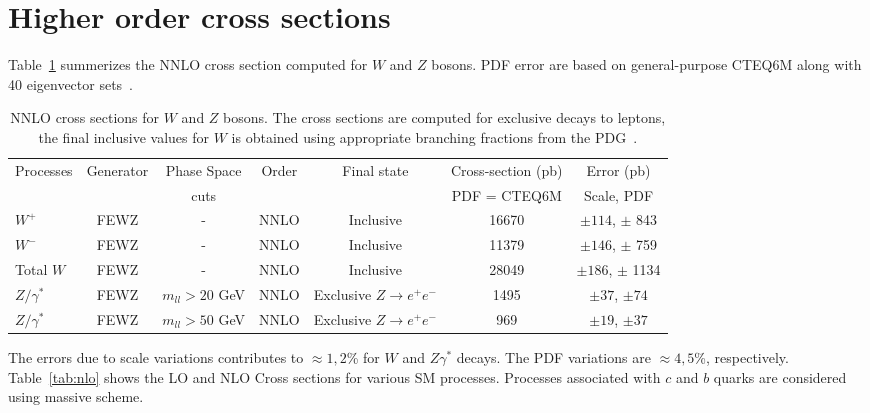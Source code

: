 \section{Higher order cross sections}
\label{sec:results}

Table~\ref{tab:nnlo} summerizes the NNLO cross section computed for $W$ and $Z$ bosons. 
PDF error are based on general-purpose CTEQ6M along with 40 eigenvector sets~\cite{cteq6m}.

\vspace{3mm}
\begin{table}[hbt]
\begin{center}
\renewcommand{\arraystretch}{1.2}
\begin{tabular}{|l|c|c|c|c|c|c|}\hline
Processes & Generator & Phase Space& Order & Final state & Cross-section (pb)& Error (pb) \\ 
 &  &  cuts & & & PDF = CTEQ6M & Scale, PDF \\ \hline
$W^+$ & FEWZ & - & NNLO & Inclusive & 16670 & $\pm 114$, $\pm$ 843 \\ \hline
$W^-$ & FEWZ & - & NNLO & Inclusive & 11379 & $\pm 146$, $\pm$ 759 \\ \hline
Total $W$ & FEWZ & - & NNLO & Inclusive & 28049 & $\pm 186$, $\pm$ 1134 \\ \hline
$Z/\gamma^*$ & FEWZ & $m_{ll} > 20$ GeV & NNLO & Exclusive $Z \rightarrow e^+e^-$ & 1495 & $\pm 37$, $\pm 74$ \\ \hline
$Z/\gamma^*$ & FEWZ & $m_{ll} > 50$ GeV & NNLO & Exclusive $Z \rightarrow e^+e^-$ & 969 & $\pm 19$, $\pm 37$ \\ \hline
\end{tabular} 
\caption{NNLO cross sections for $W$ and $Z$ bosons. The cross sections are computed for
exclusive decays to leptons, the final inclusive values for $W$ is obtained using appropriate 
branching fractions from the PDG~\cite{pdg}. \label{tab:nnlo}}
\end{center}
\end{table}

The errors due to scale variations contributes to $\approx 1, 2$\% for $W$ 
and $Z\gamma^*$ decays. The PDF variations are $\approx 4, 5$\%, respectively.
Table~\ref{tab:nlo} shows the LO and NLO Cross sections for various SM processes.
Processes associated with $c$ and $b$ quarks are considered using massive scheme.

